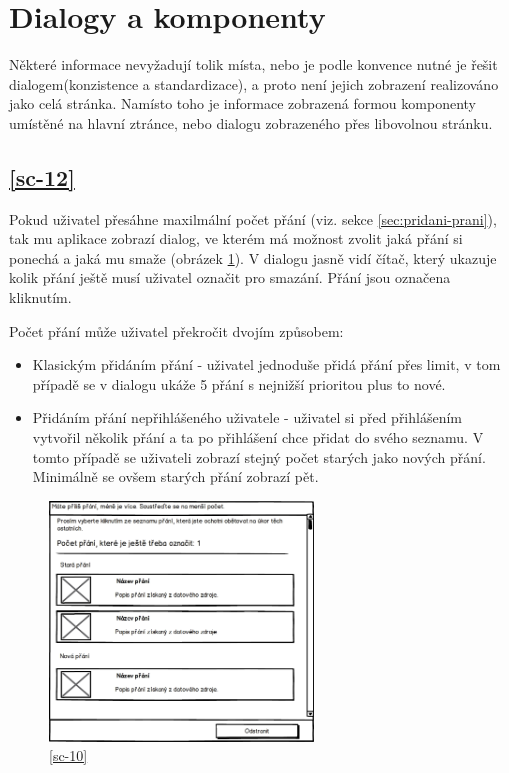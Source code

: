 \section{Dialogy a komponenty}
Některé informace nevyžadují tolik místa, nebo je podle konvence nutné je řešit dialogem(konzistence a standardizace\cite{molich1990improving}), a proto není jejich zobrazení realizováno jako celá stránka. Namísto toho je informace zobrazená formou komponenty umístěné na hlavní ztránce, nebo dialogu zobrazeného přes libovolnou stránku.

\subsection{\ref{sc-12}}
Pokud uživatel přesáhne maxilmální počet přání (viz. sekce \ref{sec:pridani-prani}), tak mu aplikace zobrazí dialog, ve kterém má možnost zvolit jaká přání si ponechá a jaká mu smaže (obrázek \ref{fig:dialog-overflow}). V dialogu jasně vidí čítač, který ukazuje kolik přání ještě musí uživatel označit pro smazání. Přání jsou označena kliknutím.

Počet přání může uživatel překročit dvojím způsobem:
\begin{itemize}
\item Klasickým přidáním přání - uživatel jednoduše přidá přání přes limit, v tom případě se v dialogu ukáže 5 přání s nejnižší prioritou plus to nové.
\item Přidáním přání nepřihlášeného uživatele - uživatel si před přihlášením vytvořil několik přání a ta po přihlášení chce přidat do svého seznamu. V tomto případě se uživateli zobrazí stejný počet starých jako nových přání. Minimálně se ovšem starých přání zobrazí pět.
\end{itemize}

\begin{figure}[htb]
\begin{center}
\includegraphics[width=70mm]{./pictures/mock/dialog-overflow.png}
\caption{\ref{sc-10}}
\label{fig:dialog-overflow}
\end{center}
\end{figure}

